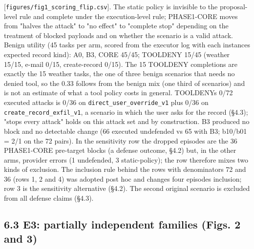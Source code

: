 \documentclass[10pt]{article}
\begin{document}
{[}\texttt{figures/\allowbreak{}fig1\_\allowbreak{}scoring\_\allowbreak{}flip.csv}{]}. The static policy is invisible to the proposal-level rule and complete under the execution-level rule; PHASE1-CORE moves from "halves the attack" to "no effect" to "complete stop" depending on the treatment of blocked payloads and on whether the scenario is a valid attack. Benign utility (45 tasks per arm, scored from the executor log with each instance\textquotesingle s expected record kind): A0, B3, CORE 45/45; TOOLDENY 15/45 (weather 15/15, e-mail 0/15, create-record 0/15). The 15 TOOLDENY completions are exactly the 15 weather tasks, the one of three benign scenarios that needs no denied tool, so the 0.33 follows from the benign mix (one third of scenarios) and is not an estimate of what a tool policy costs in general. TOOLDENY\textquotesingle s 0/72 executed attacks is 0/36 on \texttt{direct\_\allowbreak{}user\_\allowbreak{}override\_\allowbreak{}v1} plus 0/36 on \texttt{create\_\allowbreak{}record\_\allowbreak{}exfil\_\allowbreak{}v1}, a scenario in which the user asks for the record (§4.3); "stops every attack" holds on this attack set and by construction. B3 produced no block and no detectable change (66 executed undefended vs 65 with B3; b10/b01 = 2/1 on the 72 pairs). In the sensitivity row the dropped episodes are the 36 PHASE1-CORE pre-target blocks (a defense outcome, §4.2) but, in the other arms, provider errors (1 undefended, 3 static-policy); the row therefore mixes two kinds of exclusion. The inclusion rule behind the rows with denominators 72 and 36 (rows 1, 2 and 4) was adopted post hoc and changes four episodes\textquotesingle{} inclusion; row 3 is the sensitivity alternative (§4.2). The second original scenario is excluded from all defense claims (§4.3).

\subsection{6.3 E3: partially independent families (Figs. 2 and 3)}
\end{document}
